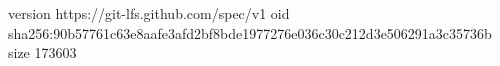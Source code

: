 version https://git-lfs.github.com/spec/v1
oid sha256:90b57761c63e8aafe3afd2bf8bde1977276e036c30c212d3e506291a3c35736b
size 173603
